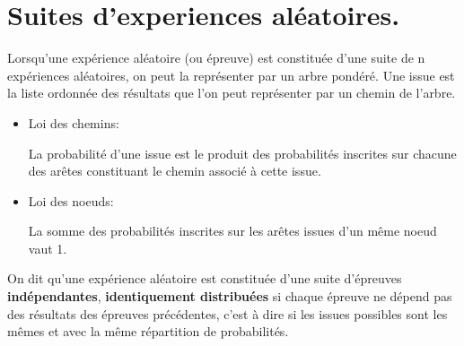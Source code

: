 \documentclass[a4paper,11pt]{article}
\theoremstyle{break}
\begin{document}
  \newpage

    \section{Suites d'experiences aléatoires.} 
    

  \begin{theorem}
      Lorsqu'une expérience aléatoire (ou épreuve) est 
      constituée d'une suite de n expériences aléatoires, 
      on peut la représenter par un arbre pondéré. 
      Une issue est la liste ordonnée des résultats que l'on peut 
      représenter par un chemin de l'arbre.
      
      \begin{itemize}
      
      \item Loi des chemins:
       
       La probabilité d'une issue est le produit des 
       probabilités inscrites sur chacune des arêtes
       constituant le chemin associé à cette issue.
       
       \item Loi des noeuds:
       
       La somme des probabilités inscrites sur les arêtes
       issues d'un même noeud vaut 1.
       
       
      \end{itemize}

   \end{theorem}
   
      \begin{definition}
   On dit qu'une expérience aléatoire est constituée d'une suite d'épreuves \textbf{indépendantes},
   \textbf{identiquement distribuées} si chaque épreuve ne dépend pas des résultats des épreuves 
   précédentes, c'est à dire si les issues possibles sont les mêmes et avec la même répartition
   de probabilités.
  \end{definition}
 
 
  
\end{document}
